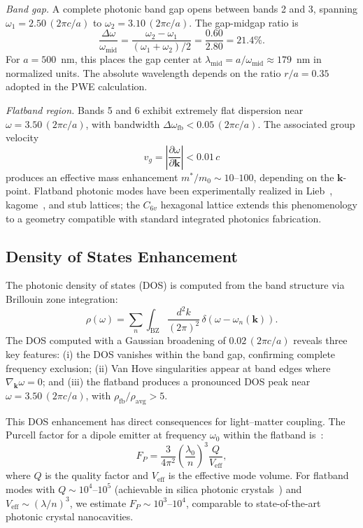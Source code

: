 \documentclass[10pt,letterpaper]{article}
\begin{document}
\textit{Band gap.} A complete photonic band gap opens between bands 2 and 3, spanning $\omega_1 = 2.50\,(2\pi c/a)$ to $\omega_2 = 3.10\,(2\pi c/a)$. The gap-midgap ratio is
\begin{equation}
\frac{\Delta\omega}{\omega_\mathrm{mid}} = \frac{\omega_2 - \omega_1}{(\omega_1 + \omega_2)/2} = \frac{0.60}{2.80} = 21.4\%.
\label{eq:gapmidgap}
\end{equation}
For $a = 500$~nm, this places the gap center at $\lambda_\mathrm{mid} = a/\omega_\mathrm{mid} \approx 179$~nm in normalized units. The absolute wavelength depends on the ratio $r/a = 0.35$ adopted in the PWE calculation.

\textit{Flatband region.} Bands 5 and 6 exhibit extremely flat dispersion near $\omega = 3.50\,(2\pi c/a)$, with bandwidth $\Delta\omega_\mathrm{fb} < 0.05\,(2\pi c/a)$. The associated group velocity
\begin{equation}
v_g = \left|\frac{\partial\omega}{\partial\mathbf{k}}\right| < 0.01\,c
\label{eq:groupvel}
\end{equation}
produces an effective mass enhancement $m^*/m_0 \sim 10$--$100$, depending on the $\mathbf{k}$-point. Flatband photonic modes have been experimentally realized in Lieb~\cite{Lustig2019}, kagome~\cite{Pertsch2002}, and stub lattices; the $C_{6v}$ hexagonal lattice extends this phenomenology to a geometry compatible with standard integrated photonics fabrication.

\subsection{Density of States Enhancement}

The photonic density of states (DOS) is computed from the band structure via Brillouin zone integration:
\begin{equation}
\rho(\omega) = \sum_n \int_\mathrm{BZ} \frac{d^2k}{(2\pi)^2}\,\delta(\omega - \omega_n(\mathbf{k})).
\label{eq:dos}
\end{equation}
The DOS computed with a Gaussian broadening of $0.02\,(2\pi c/a)$ reveals three key features: (i) the DOS vanishes within the band gap, confirming complete frequency exclusion; (ii) Van Hove singularities appear at band edges where $\nabla_\mathbf{k}\omega = 0$; and (iii) the flatband produces a pronounced DOS peak near $\omega = 3.50\,(2\pi c/a)$, with $\rho_\mathrm{fb}/\rho_\mathrm{avg} > 5$.

This DOS enhancement has direct consequences for light--matter coupling. The Purcell factor for a dipole emitter at frequency $\omega_0$ within the flatband is~\cite{Akahane2003}:
\begin{equation}
F_P = \frac{3}{4\pi^2}\left(\frac{\lambda_0}{n}\right)^3 \frac{Q}{V_\mathrm{eff}},
\label{eq:purcell}
\end{equation}
where $Q$ is the quality factor and $V_\mathrm{eff}$ is the effective mode volume. For flatband modes with $Q \sim 10^4$--$10^5$ (achievable in silica photonic crystals~\cite{Akahane2003,Vuckovic2002}) and $V_\mathrm{eff} \sim (\lambda/n)^3$, we estimate $F_P \sim 10^3$--$10^4$, comparable to state-of-the-art photonic crystal nanocavities.
\end{document}
